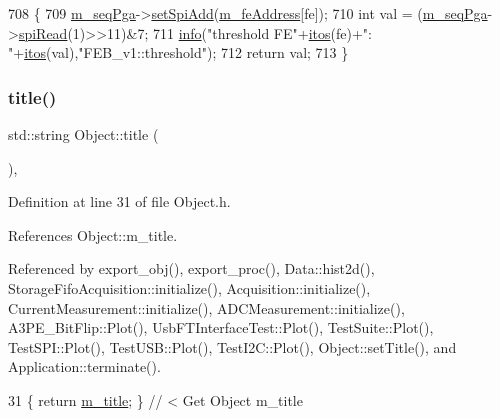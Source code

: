 \begin{DoxyCode}
708                              \{
709   \hyperlink{classFEB__v1_a6c7804ac86796f233a8393043adf2e77}{m\_seqPga}->\hyperlink{classSeqPGA_ac998ce3a6d9b5f2e88cc8393f8c1df53}{setSpiAdd}(\hyperlink{classFEB__v1_a4e1945c2d5b434125f375e9d0fc6d99f}{m\_feAddress}[fe]);
710   \textcolor{keywordtype}{int} val = (\hyperlink{classFEB__v1_a6c7804ac86796f233a8393043adf2e77}{m\_seqPga}->\hyperlink{classSeqPGA_ab3d0e5e5d4014bc7a92588a76b8713d4}{spiRead}(1)>>11)&7;
711   \hyperlink{classObject_a644fd329ea4cb85f54fa6846484b84a8}{info}(\textcolor{stringliteral}{"threshold FE"}+\hyperlink{Tools_8h_af330027dbdafb9a30768b3613c553e60}{itos}(fe)+\textcolor{stringliteral}{": "}+\hyperlink{Tools_8h_af330027dbdafb9a30768b3613c553e60}{itos}(val),\textcolor{stringliteral}{"FEB\_v1::threshold"});
712   \textcolor{keywordflow}{return} val;
713 \}
\end{DoxyCode}
\mbox{\label{classObject_a73a0f1a41828fdd8303dd662446fb6c3}} 
\subsubsection{\texorpdfstring{title()}{title()}}
{\footnotesize\ttfamily std\+::string Object\+::title (\begin{DoxyParamCaption}{ }\end{DoxyParamCaption})\hspace{0.3cm}{\ttfamily [inline]}, {\ttfamily [inherited]}}



Definition at line 31 of file Object.\+h.



References Object\+::m\+\_\+title.



Referenced by export\+\_\+obj(), export\+\_\+proc(), Data\+::hist2d(), Storage\+Fifo\+Acquisition\+::initialize(), Acquisition\+::initialize(), Current\+Measurement\+::initialize(), A\+D\+C\+Measurement\+::initialize(), A3\+P\+E\+\_\+\+Bit\+Flip\+::\+Plot(), Usb\+F\+T\+Interface\+Test\+::\+Plot(), Test\+Suite\+::\+Plot(), Test\+S\+P\+I\+::\+Plot(), Test\+U\+S\+B\+::\+Plot(), Test\+I2\+C\+::\+Plot(), Object\+::set\+Title(), and Application\+::terminate().


\begin{DoxyCode}
31 \{ \textcolor{keywordflow}{return} \hyperlink{classObject_affbeea1953eb5163573b92fad8f75727}{m\_title};      \} \textcolor{comment}{// < Get Object m\_title}
\end{DoxyCode}
\mbox{\label{classHierarchy_a76e914b9a677a22a82deb74d892bf261}} 
